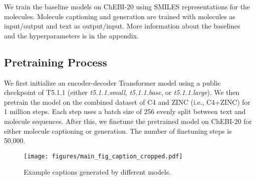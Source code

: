 We train the baseline models on ChEBI-20 using SMILES representations for the molecules. Molecule captioning and generation are trained with molecules as input/output and text as output/input. More information about the baselines and the hyperparameters is in the appendix. 


\subsection{Pretraining Process}
We first initialize an encoder-decoder Transformer model using a public checkpoint of T5.1.1 (either \textit{t5.1.1.small}, \textit{t5.1.1.base}, or \textit{t5.1.1.large}). We then pretrain the model on the combined dataset of C4 and ZINC (i.e., C4+ZINC) for 1 million steps. Each step uses a batch size of 256 evenly split between text and molecule sequences. After this, we finetune the pretrained model on ChEBI-20 for either molecule captioning or generation. The number of finetuning steps is 50,000.


\begin{table*}[ht!]
\caption{Molecule captioning results on the test split of CheBI-20. Rouge scores are F1 values.}
\label{tab:results_captioning}
\end{table*}
 \begin{figure*}[t]
\centering
\texttt{[image: figures/main\_fig\_caption\_cropped.pdf]}
\caption{Example captions generated by different models.}
\label{fig:qual_caption}
\end{figure*}


